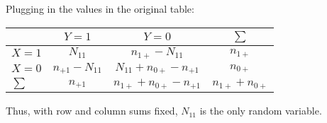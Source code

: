 \documentclass{article}
\begin{document}
Plugging in the values in the original table:
\begin{table}[h!]
\centering
\begin{tabular}{l|c c c}
 & \(Y=1\) & \(Y=0\) & \(\sum\) \\ \hline
\(X=1\) & \(N_{11}\) & \(n_{1+}-N_{11}\) & \(n_{1+}\) \\
\(X=0\) & \(n_{+1}-N_{11}\) & \(N_{11}+n_{0+}-n_{+1}\) & \(n_{0+}\) \\
\(\sum\) & \(n_{+1}\) & \(n_{1+}+n_{0+}-n_{+1}\) & \(n_{1+}+n_{0+}\) \\
\end{tabular}
\label{tab:2way}
\end{table}
Thus, with row and column sums fixed, \(N_{11}\) is the only random variable.
\end{document}

